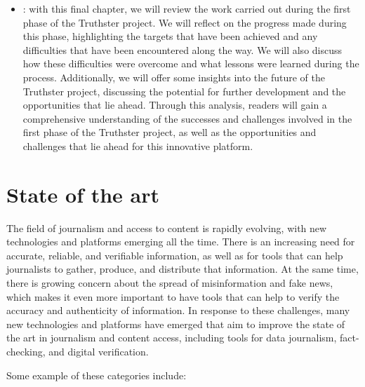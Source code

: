 \documentclass[target=mst,aauheader=]{thud}
\begin{document}
\begin{itemize}
    \item \textbf{}: with this final chapter, we will review the work carried out during the first phase of the Truthster project. We will reflect on the progress made during this phase, highlighting the targets that have been achieved and any difficulties that have been encountered along the way. We will also discuss how these difficulties were overcome and what lessons were learned during the process. Additionally, we will offer some insights into the future of the Truthster project, discussing the potential for further development and the opportunities that lie ahead. Through this analysis, readers will gain a comprehensive understanding of the successes and challenges involved in the first phase of the Truthster project, as well as the opportunities and challenges that lie ahead for this innovative platform.

\end{itemize}




\chapter{State of the art}
\label{chapter:stateOfTheArt}

The field of journalism and access to content is rapidly evolving, with new technologies and platforms emerging all the time. There is an increasing need for accurate, reliable, and verifiable information, as well as for tools that can help journalists to gather, produce, and distribute that information. At the same time, there is growing concern about the spread of misinformation and fake news\cite{DefiningFakeNews}, which makes it even more important to have tools that can help to verify the accuracy and authenticity of information. In response to these challenges, many new technologies and platforms have emerged that aim to improve the state of the art in journalism and content access, including tools for data journalism, fact-checking, and digital verification.\par
Some example of these categories include:
\end{document}
